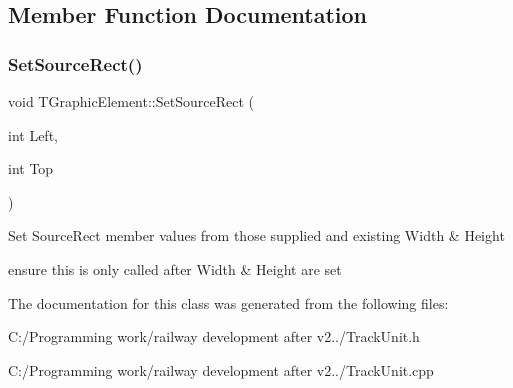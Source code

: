 \subsection{Member Function Documentation}
\mbox{\label{class_t_graphic_element_adffdc9f9c4a5fff5cbeab6b5a027dad9}} 
\subsubsection{\texorpdfstring{Set\+Source\+Rect()}{SetSourceRect()}}
{\footnotesize\ttfamily void T\+Graphic\+Element\+::\+Set\+Source\+Rect (\begin{DoxyParamCaption}\item[{int}]{Left,  }\item[{int}]{Top }\end{DoxyParamCaption})\hspace{0.3cm}{\ttfamily [inline]}}

Set Source\+Rect member values from those supplied and existing Width \& Height


\begin{DoxyItemize}
\item ensure this is only called after Width \& Height are set 
\end{DoxyItemize}

The documentation for this class was generated from the following files\+:\begin{DoxyCompactItemize}
\item 
C\+:/\+Programming work/railway development after v2../Track\+Unit.\+h\item 
C\+:/\+Programming work/railway development after v2../Track\+Unit.\+cpp\end{DoxyCompactItemize}
